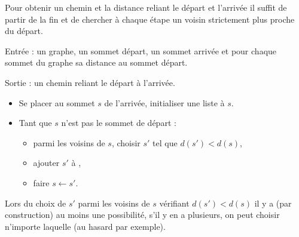 \documentclass[11pt,class=report,crop=false]{standalone}
\begin{document}
Pour obtenir un chemin et la distance reliant le départ et l'arrivée il suffit de partir de la fin et de chercher à chaque étape un voisin strictement plus proche du départ.



\begin{algorithme}
Entrée : un graphe, un sommet \og{}départ\fg{}, un sommet \og{}arrivée\fg{} et pour chaque sommet du graphe sa distance au sommet \og{}départ\fg{}.

Sortie  : un chemin reliant le départ à l'arrivée.

\begin{itemize}
	\item Se placer au sommet $s$ de l'arrivée, initialiser une liste  à $s$.
	
	\item Tant que $s$ n'est pas le sommet de départ :
	\begin{itemize}
		\item parmi les voisins de $s$, choisir $s'$ tel que $d(s') < d(s)$,
		\item ajouter $s'$ à ,
		\item faire $s \leftarrow s'$.
	\end{itemize}	
\end{itemize}  
\end{algorithme}

Lors du choix de $s'$ parmi les voisins de $s$ vérifiant $d(s') < d(s)$ il y a (par construction) au moins une possibilité, s'il y en a plusieurs, on peut  choisir n'importe laquelle (au hasard par exemple).
\end{document}
